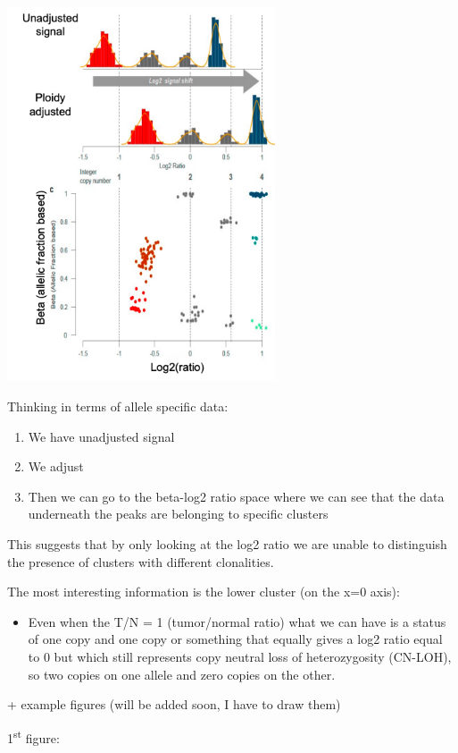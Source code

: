 \includegraphics[width=3.12639in,height=4.35903in]{image11.png}

Thinking in terms of allele specific data:

\begin{enumerate}
\def\labelenumi{\arabic{enumi}.}
\item
  We have unadjusted signal
\item
  We adjust
\item
  Then we can go to the beta-log2 ratio space where we can see that the data
  underneath the peaks are belonging to specific clusters
\end{enumerate}

This suggests that by only looking at the log2 ratio we are unable to
distinguish the presence of clusters with different clonalities.

The most interesting information is the lower cluster (on the x=0 axis):

\begin{itemize}
\item
  Even when the T/N = 1 (tumor/normal ratio) what we can have is a status of one
  copy and one copy or something that equally gives a log2 ratio equal to 0 but
  which still represents copy neutral loss of heterozygosity (CN-LOH), so two
  copies on one allele and zero copies on the other.
\end{itemize}

+ example figures (will be added soon, I have to draw them)

1\textsuperscript{st} figure:

